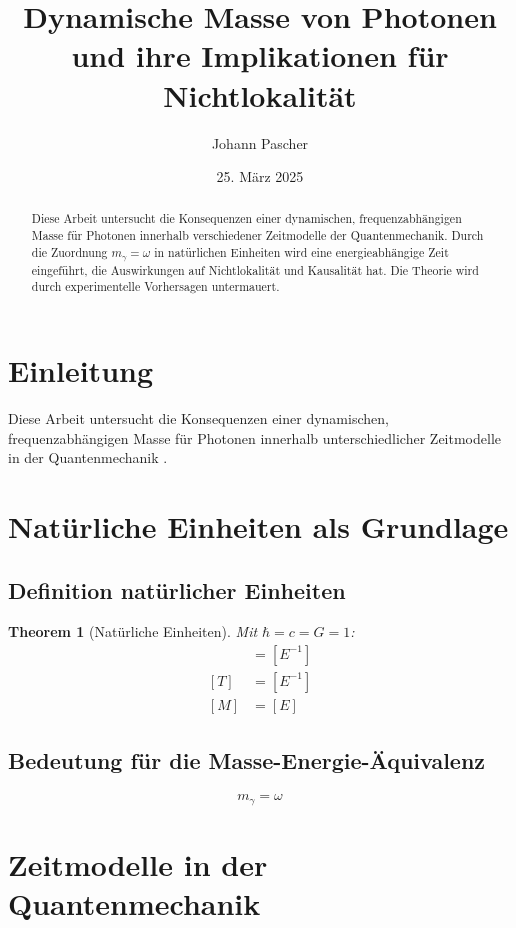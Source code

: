 \documentclass[12pt,a4paper]{article}
\title{Dynamische Masse von Photonen und ihre Implikationen für Nichtlokalität}
\author{Johann Pascher}
\date{25. März 2025}
\newtheorem{theorem}{Theorem}[section]
\begin{document}
	
	\maketitle
	
	\begin{abstract}
		Diese Arbeit untersucht die Konsequenzen einer dynamischen, frequenzabhängigen Masse für Photonen innerhalb verschiedener Zeitmodelle der Quantenmechanik. Durch die Zuordnung \(m_\gamma = \omega\) in natürlichen Einheiten wird eine energieabhängige Zeit eingeführt, die Auswirkungen auf Nichtlokalität und Kausalität hat. Die Theorie wird durch experimentelle Vorhersagen untermauert.
	\end{abstract}
	
	\tableofcontents
	\newpage
	
	\section{Einleitung}
	Diese Arbeit untersucht die Konsequenzen einer dynamischen, frequenzabhängigen Masse für Photonen innerhalb unterschiedlicher Zeitmodelle in der Quantenmechanik \cite{pascher1}.
	
	\section{Natürliche Einheiten als Grundlage}
	\subsection{Definition natürlicher Einheiten}
	\begin{theorem}[Natürliche Einheiten]
		Mit \(\hbar = c = G = 1\):
		\begin{align}
			[L] &= [E^{-1}] \\
			[T] &= [E^{-1}] \\
			[M] &= [E]
		\end{align}
	\end{theorem}
	
	\subsection{Bedeutung für die Masse-Energie-Äquivalenz}
	\begin{equation}
		m_\gamma = \omega
	\end{equation}
	
	\section{Zeitmodelle in der Quantenmechanik}
\end{document}
